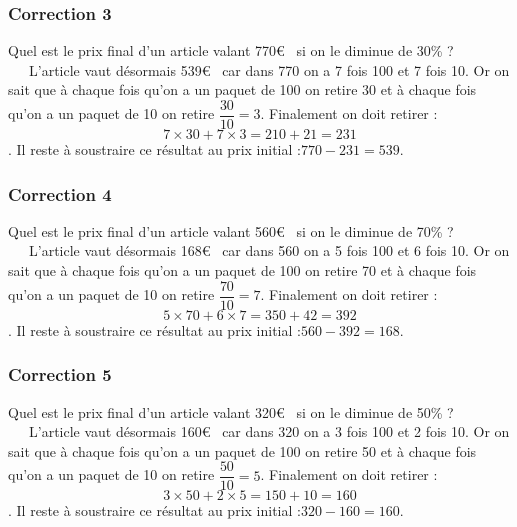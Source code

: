 \documentclass[15pt, mathserif]{beamer}
\begin{document}
\begin{frame}
\vspace{-10mm}
	\frametitle{Correction 3}
Quel est le prix final d'un article valant 770\euro ~ si on le diminue de 30\% ? \\ ~~\ L'article vaut désormais 539\euro ~ car dans 770 on a 7 fois 100 et 7 fois 10. Or on sait que à chaque fois qu'on a un paquet de 100 on retire 30 et à chaque fois qu'on a un paquet de 10 on retire $\dfrac{30}{10}=3$. Finalement on doit retirer : $$7\times 30 + 7\times3 = 210+21=231$$. Il reste à soustraire ce résultat au prix initial :$770-231=539$.\end{frame}


\begin{frame}
\vspace{-10mm}
	\frametitle{Correction 4}
Quel est le prix final d'un article valant 560\euro ~ si on le diminue de 70\% ? \\ ~~\ L'article vaut désormais 168\euro ~ car dans 560 on a 5 fois 100 et 6 fois 10. Or on sait que à chaque fois qu'on a un paquet de 100 on retire 70 et à chaque fois qu'on a un paquet de 10 on retire $\dfrac{70}{10}=7$. Finalement on doit retirer : $$5\times 70 + 6\times7 = 350+42=392$$. Il reste à soustraire ce résultat au prix initial :$560-392=168$.\end{frame}


\begin{frame}
\vspace{-10mm}
	\frametitle{Correction 5}
Quel est le prix final d'un article valant 320\euro ~ si on le diminue de 50\% ? \\ ~~\ L'article vaut désormais 160\euro ~ car dans 320 on a 3 fois 100 et 2 fois 10. Or on sait que à chaque fois qu'on a un paquet de 100 on retire 50 et à chaque fois qu'on a un paquet de 10 on retire $\dfrac{50}{10}=5$. Finalement on doit retirer : $$3\times 50 + 2\times5 = 150+10=160$$. Il reste à soustraire ce résultat au prix initial :$320-160=160$.\end{frame}
\end{document}
